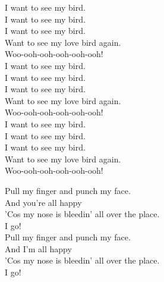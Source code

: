


I want to see my  bird. \\
I want to see my  bird. \\
I want to see my  bird. \\
Want to see my love bird again. \\

Woo-ooh-ooh-ooh-ooh-ooh! \\

I want to see my  bird. \\
I want to see my  bird. \\
I want to see my  bird. \\
Want to see my love bird again. \\

Woo-ooh-ooh-ooh-ooh-ooh! \\

I want to see my  bird. \\
I want to see my  bird. \\
I want to see my  bird. \\
Want to see my love bird again. \\

Woo-ooh-ooh-ooh-ooh-ooh! \\




Pull my finger and punch my face. \\
And you're all happy \\
'Cos my nose is bleedin' all over the place. \\
I go! \\

Pull my finger and punch my face. \\
And I'm all happy \\
'Cos my nose is bleedin' all over the place. \\
I go! \\



